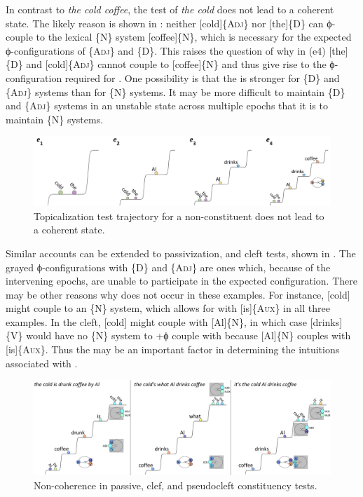   In contrast to \textit{the cold coffee}, the  test of \textit{the cold} does not lead to a coherent state. The likely reason is shown in {}: neither [cold]\{A\textsc{dj}\} nor [the]\{D\} can ϕ-couple to the lexical \{N\} system [coffee]\{N\}, which is necessary for the expected ϕ-configurations of \{A\textsc{dj}\} and \{D\}. This raises the question of why in (e4) [the]\{D\} and [cold]\{A\textsc{dj}\} cannot couple to [coffee]\{N\} and thus give rise to the ϕ-configuration required for . One possibility is that the  is stronger for \{D\} and \{A\textsc{dj}\} systems than for \{N\} systems. It may be more difficult to maintain \{D\} and \{A\textsc{dj}\} systems in an unstable state across multiple epochs that it is to maintain \{N\} systems.

  
\begin{figure}
\includegraphics[width=\textwidth]{figures/Tilsen-img139.png}
\caption{Topicalization test trajectory for a non-constituent does not lead to a coherent state.}
\label{fig:6:20}
\end{figure}
 

  Similar accounts can be extended to passivization,  and cleft tests, shown in {}. The grayed ϕ-configurations with \{D\} and \{A\textsc{dj}\} are ones which, because of the intervening epochs, are unable to participate in the expected configuration. There may be other reasons why  does not occur in these examples. For instance, [cold] might couple to an \{N\} system, which allows for  with [is]\{A\textsc{ux}\} in all three examples. In the cleft, [cold] might couple with [Al]\{N\}, in which case [drinks]\{V\} would have no \{N\} system to +ϕ couple with because [Al]\{N\} couples with [is]\{A\textsc{ux}\}. Thus the  may be an important factor in determining the  intuitions associated with .   

  
\begin{figure}
\includegraphics[width=\textwidth]{figures/Tilsen-img140.png}
\caption{Non-coherence in passive, clef, and pseudocleft constituency tests.}
\label{fig:6:21}
\end{figure}
 

